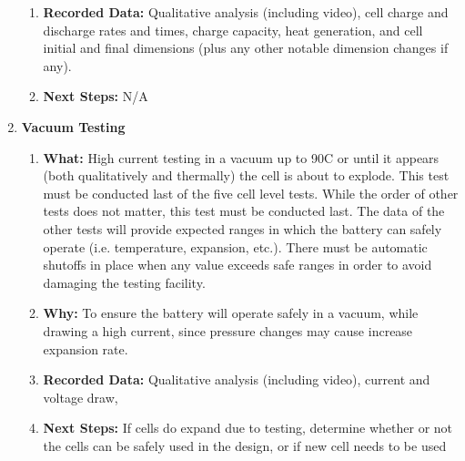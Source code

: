 \documentclass{report}
\begin{document}
\begin{enumerate}
\begin{enumerate}
            \item \textbf{Recorded Data: }Qualitative analysis (including video), cell charge and discharge rates and times, charge capacity, heat generation, and cell initial and final dimensions (plus any other notable dimension changes if any).
            \item \textbf{Next Steps: }N/A
        \end{enumerate}
        \item \textbf{Vacuum Testing}
        \begin{enumerate}
            \item \textbf{What: }High current testing in a vacuum up to 90C or until it appears (both qualitatively and thermally) the cell is about to explode. This test must be conducted last of the five cell level tests. While the order of other tests does not matter, this test must be conducted last. The data of the other tests will provide expected ranges in which the battery can safely operate (i.e. temperature, expansion, etc.). There must be automatic shutoffs in place when any value exceeds safe ranges in order to avoid damaging the testing facility.
            \item \textbf{Why: }To ensure the battery will operate safely in a vacuum, while drawing a high current, since pressure changes may cause increase expansion rate.
            \item \textbf{Recorded Data: }Qualitative analysis (including video), current and voltage draw,
            \item \textbf{Next Steps: }If cells do expand due to testing, determine whether or not the cells can be safely used in the design, or if new cell needs to be used
        \end{enumerate}
    \end{enumerate}
\end{document}
